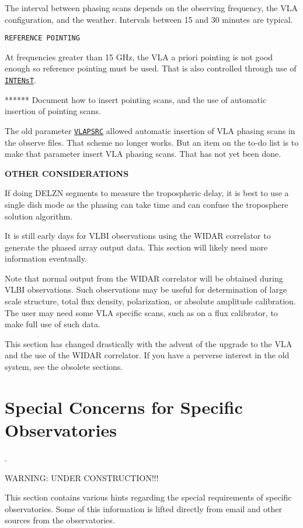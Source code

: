 \documentclass{report}
\begin{document}
The interval between phasing scans depends on the observing frequency,
the VLA configuration, and the weather.  Intervals between 15 and 30 minutes
are typical. %

{\tt REFERENCE POINTING}

At frequencies greater than 15 GHz, the VLA a priori pointing is not good enough so
reference pointing must be used.  That is also controlled through use
of 
{\hyperref[MP:INTENTs]{{\tt INTENsT}}}.

******  Document how to insert pointing scans, and the use of 
automatic insertion of pointing scans.

The old parameter 
{\hyperref[MP:VLAPSRC]{{\tt VLAPSRC}}} allowed automatic
insertion of VLA phasing scans in the observe files.  That scheme no 
longer works.  But an item on the to-do list is to make that parameter
insert VLA phasing scans.  That has not yet been done.


{\bf OTHER CONSIDERATIONS}

If doing DELZN segments to measure the tropospheric delay, it is best
to use a single dish mode as the phasing can take time and can confuse 
the troposphere solution algorithm.

It is still early days for VLBI observations using the WIDAR correlator
to generate the phased array output data.  This section will likely
need more information eventually.

Note that normal output from the WIDAR correlator will be obtained during
VLBI observations.  Such observations may be useful for determination 
of large scale structure, total flux density, polarization, or absolute
amplitude calibration.  The user may need some VLA specific scans, such
as on a flux calibrator, to make full use of such data.

This section has changed drastically with the advent of the upgrade
to the VLA and the use of the WIDAR correlator.  If you have a perverse
interest in the old system, see the obsolete sections.


\section{\label{SEC:INDIV}Special Concerns for Specific Observatories}.

WARNING:  UNDER CONSTRUCTION!!!

This section contains various hints regarding the special requirements
of specific observatories.  Some of this information is lifted directly
from email and other sources from the observatories.
\end{document}
